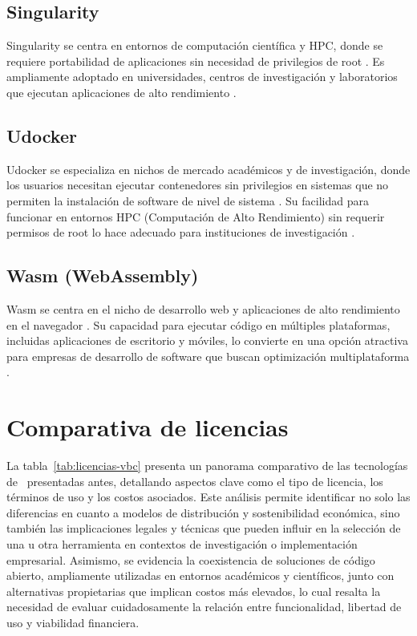 \subsection{Singularity}
\noindent
Singularity se centra en entornos de computación científica y HPC, donde se requiere portabilidad de aplicaciones sin necesidad de privilegios de root \citep{10.1145/3332186.3332192}. Es ampliamente adoptado en universidades, centros de investigación y laboratorios que ejecutan aplicaciones de alto rendimiento \citep{Kurtzer2017}.

\subsection{Udocker}
\noindent
Udocker se especializa en nichos de mercado académicos y de investigación, donde los usuarios necesitan ejecutar contenedores sin privilegios en sistemas que no permiten la instalación de software de nivel de sistema \citep{Campos2017}. Su facilidad para funcionar en entornos HPC (Computación de Alto Rendimiento) sin requerir permisos de root lo hace adecuado para instituciones de investigación \citep{Gomes2018}.

\subsection{Wasm (WebAssembly)}
\noindent
Wasm se centra en el nicho de desarrollo web y aplicaciones de alto rendimiento en el navegador \citep{Haas2017}. Su capacidad para ejecutar código en múltiples plataformas, incluidas aplicaciones de escritorio y móviles, lo convierte en una opción atractiva para empresas de desarrollo de software que buscan optimización multiplataforma \citep{Jangda2019}.
\clearpage
\section{Comparativa de licencias}
\noindent
La tabla~\ref{tab:licencias-vbc} presenta un panorama comparativo de las tecnologías de \VBC\ presentadas antes, detallando aspectos clave como el tipo de licencia, los términos de uso y los costos asociados. Este análisis permite identificar no solo las diferencias en cuanto a modelos de distribución y sostenibilidad económica, sino también las implicaciones legales y técnicas que pueden influir en la selección de una u otra herramienta en contextos de investigación o implementación empresarial. Asimismo, se evidencia la coexistencia de soluciones de código abierto, ampliamente utilizadas en entornos académicos y científicos, junto con alternativas propietarias que implican costos más elevados, lo cual resalta la necesidad de evaluar cuidadosamente la relación entre funcionalidad, libertad de uso y viabilidad financiera.


